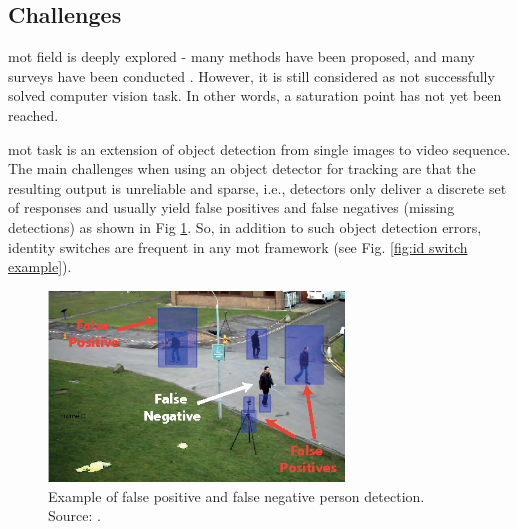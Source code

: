 \begin{introduction}
    \section{Challenges}
        \gls{mot} field is deeply explored - many methods have been proposed, and many surveys have been conducted \cite{luo2014multiple, fan2016survey, emami2018machine}. However, it is still considered as not successfully solved computer vision task. In other words, a saturation point has not yet been reached.
        
        \gls{mot} task is an extension of object detection from single images to video sequence. 
        The main challenges when using an object detector for tracking are that the resulting output is unreliable and sparse, i.e., detectors only deliver a discrete set of responses and usually yield false positives and false negatives (missing detections) as shown in Fig \ref{fig:false positive and false negative}. So, in addition to such object detection errors, identity switches are frequent in any \gls{mot} framework (see Fig. \ref{fig:id switch example}). 
    
        \begin{figure}[ht]
          \centering
          \includegraphics[width=0.7\textwidth]{resources/false-positive-and-false-negative.png}
          \caption{Example of false positive and false negative person detection. Source: \cite{yao2012interactive}.}
          \label{fig:false positive and false negative}
        \end{figure}
        

\end{introduction}
